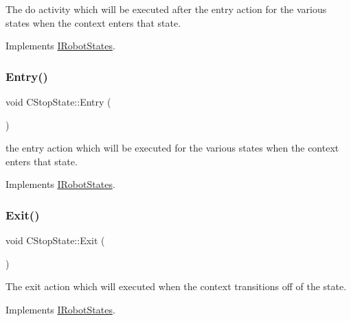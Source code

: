 The do activity which will be executed after the entry action for the various states when the context enters that state. 



Implements \hyperlink{classIRobotStates_aa681381e72738a2870c3f13f552a2e93}{I\+Robot\+States}.

\mbox{\label{classCStopState_aae7dbdb7db312f20a16fcd48edc60e83}} 
\subsubsection{\texorpdfstring{Entry()}{Entry()}}
{\footnotesize\ttfamily void C\+Stop\+State\+::\+Entry (\begin{DoxyParamCaption}{ }\end{DoxyParamCaption})\hspace{0.3cm}{\ttfamily [virtual]}}



the entry action which will be executed for the various states when the context enters that state. 



Implements \hyperlink{classIRobotStates_af43ddb52f5100b42c3d11b71fb1f10dd}{I\+Robot\+States}.

\mbox{\label{classCStopState_a2bf7d1e44a9b0c689c86fb00f9684a7b}} 
\subsubsection{\texorpdfstring{Exit()}{Exit()}}
{\footnotesize\ttfamily void C\+Stop\+State\+::\+Exit (\begin{DoxyParamCaption}{ }\end{DoxyParamCaption})\hspace{0.3cm}{\ttfamily [virtual]}}



The exit action which will executed when the context transitions off of the state. 



Implements \hyperlink{classIRobotStates_a099417875e67f047ca38e08890491529}{I\+Robot\+States}.

\mbox{\label{classCStopState_abe6af38d9c6b80b98fd78cdb48d7599c}} 
